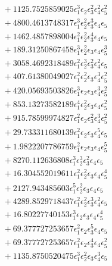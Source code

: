 \documentclass[10pt]{article}
\begin{document}
\begin{align*}
&{}  + 1125.7525859025 \epsilon_{1}^{3} \epsilon_{2} \epsilon_{3}^{2} \epsilon_{4}^{2} \epsilon_{5}^{2} \\
&{}  + 4800.4613748317 \epsilon_{1}^{3} \epsilon_{2}^{2} \epsilon_{3}^{3} \epsilon_{4} \epsilon_{5} \\
&{}  + 1462.4857898004 \epsilon_{1}^{2} \epsilon_{2}^{2} \epsilon_{3}^{4} \epsilon_{4} \epsilon_{5} \\
&{}  + 189.31250867458 \epsilon_{1}^{3} \epsilon_{2}^{2} \epsilon_{3} \epsilon_{4} \epsilon_{5}^{3} \\
&{}  + 3058.4692318489 \epsilon_{1}^{2} \epsilon_{2}^{3} \epsilon_{3}^{2} \epsilon_{4}^{2} \epsilon_{5} \\
&{}  + 407.61380049027 \epsilon_{1}^{2} \epsilon_{2}^{2} \epsilon_{3} \epsilon_{4}^{3} \epsilon_{5}^{2} \\
&{}  + 420.05693503826 \epsilon_{1}^{3} \epsilon_{2} \epsilon_{3} \epsilon_{4}^{3} \epsilon_{5}^{2} \\
&{}  + 853.13273582189 \epsilon_{1}^{4} \epsilon_{2}^{2} \epsilon_{3} \epsilon_{4} \epsilon_{5}^{2} \\
&{}  + 915.78599974827 \epsilon_{1}^{2} \epsilon_{2} \epsilon_{3}^{2} \epsilon_{4}^{3} \epsilon_{5}^{2} \\
&{}  + 29.733311680139 \epsilon_{1}^{2} \epsilon_{2} \epsilon_{3} \epsilon_{4}^{5} \epsilon_{5} \\
&{}  + 1.9822207786759 \epsilon_{1}^{2} \epsilon_{2} \epsilon_{3} \epsilon_{4} \epsilon_{5}^{5} \\
&{}  + 8270.112636808 \epsilon_{1}^{3} \epsilon_{2}^{3} \epsilon_{3}^{2} \epsilon_{4} \epsilon_{5} \\
&{}  + 16.304552019611 \epsilon_{1}^{2} \epsilon_{2}^{2} \epsilon_{3} \epsilon_{4} \epsilon_{5}^{4} \\
&{}  + 2127.943485603 \epsilon_{1}^{5} \epsilon_{2}^{2} \epsilon_{3} \epsilon_{4} \epsilon_{5} \\
&{}  + 4289.8529718437 \epsilon_{1}^{2} \epsilon_{2}^{2} \epsilon_{3}^{3} \epsilon_{4}^{2} \epsilon_{5} \\
&{}  + 16.80227740153 \epsilon_{1}^{3} \epsilon_{2} \epsilon_{3} \epsilon_{4} \epsilon_{5}^{4} \\
&{}  + 69.377727253657 \epsilon_{1}^{2} \epsilon_{2} \epsilon_{3}^{5} \epsilon_{4} \epsilon_{5} \\
&{}  + 69.377727253657 \epsilon_{1}^{2} \epsilon_{2} \epsilon_{3}^{4} \epsilon_{4} \epsilon_{5}^{2} \\
&{}  + 1135.8750520475 \epsilon_{1}^{3} \epsilon_{2}^{2} \epsilon_{3} \epsilon_{4}^{3} \epsilon_{5} \\

\end{align*}
\end{document}
